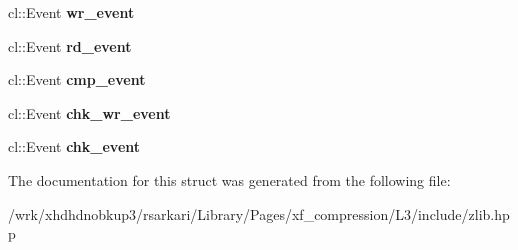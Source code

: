 \begin{DoxyCompactItemize}
\item 
\hypertarget{structxf_1_1compression_1_1buffers_a0ce3c454c580f2027e0796d454cd30e4}{cl\-::\-Event {\bfseries wr\-\_\-event}}\label{structxf_1_1compression_1_1buffers_a0ce3c454c580f2027e0796d454cd30e4}

\item 
\hypertarget{structxf_1_1compression_1_1buffers_a4fd659a33f8f0298605415dd42f92799}{cl\-::\-Event {\bfseries rd\-\_\-event}}\label{structxf_1_1compression_1_1buffers_a4fd659a33f8f0298605415dd42f92799}

\item 
\hypertarget{structxf_1_1compression_1_1buffers_ae2e6d8ae62559fc3084ec9183dd75e12}{cl\-::\-Event {\bfseries cmp\-\_\-event}}\label{structxf_1_1compression_1_1buffers_ae2e6d8ae62559fc3084ec9183dd75e12}

\item 
\hypertarget{structxf_1_1compression_1_1buffers_a1841f2e58b1dfcea72e10b1dc5760f21}{cl\-::\-Event {\bfseries chk\-\_\-wr\-\_\-event}}\label{structxf_1_1compression_1_1buffers_a1841f2e58b1dfcea72e10b1dc5760f21}

\item 
\hypertarget{structxf_1_1compression_1_1buffers_a7eb1c54115cc8f4a352fe55244dec57c}{cl\-::\-Event {\bfseries chk\-\_\-event}}\label{structxf_1_1compression_1_1buffers_a7eb1c54115cc8f4a352fe55244dec57c}

\end{DoxyCompactItemize}


The documentation for this struct was generated from the following file\-:\begin{DoxyCompactItemize}
\item 
/wrk/xhdhdnobkup3/rsarkari/\-Library/\-Pages/xf\-\_\-compression/\-L3/include/zlib.\-hpp\end{DoxyCompactItemize}
